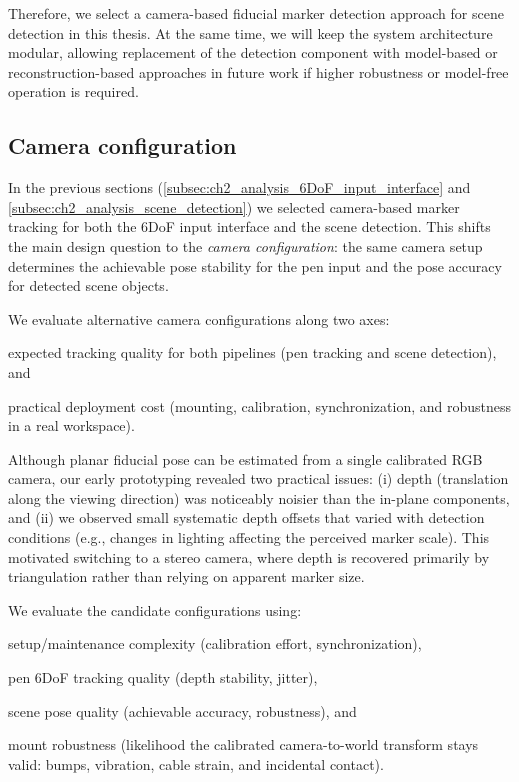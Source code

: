 Therefore, we select a camera-based fiducial marker detection approach for scene detection in this thesis. At the same time, we will keep the system architecture modular, allowing replacement of the detection component with model-based or reconstruction-based approaches in future work if higher robustness or model-free operation is required.


\subsection{Camera configuration} \label{subsec:ch2_analysis_camera_tradeoffs}

In the previous sections (\autoref{subsec:ch2_analysis_6DoF_input_interface} and \autoref{subsec:ch2_analysis_scene_detection}) we selected camera-based marker tracking for both the 6DoF input interface and the scene detection. This shifts the main design question to the \emph{camera configuration}: the same camera setup determines the achievable pose stability for the pen input and the pose accuracy for detected scene objects.

We evaluate alternative camera configurations along two axes:
\begin{enumerate*}[label=(\roman*)]
  \item expected tracking quality for both pipelines (pen tracking and scene detection), and
  \item practical deployment cost (mounting, calibration, synchronization, and robustness in a real workspace).
\end{enumerate*}

Although planar fiducial pose can be estimated from a single calibrated RGB camera, our early prototyping revealed two practical issues: (i) depth (translation along the viewing direction) was noticeably noisier than the in-plane components, and (ii) we observed small systematic depth offsets that varied with detection conditions (e.g., changes in lighting affecting the perceived marker scale). This motivated switching to a stereo camera, where depth is recovered primarily by triangulation rather than relying on apparent marker size.

We evaluate the candidate configurations using:
\begin{enumerate*}[label=(\roman*)]
    \item setup/maintenance complexity (calibration effort, synchronization),
    \item pen 6DoF tracking quality (depth stability, jitter),
    \item scene pose quality (achievable accuracy, robustness), and
    \item mount robustness (likelihood the calibrated camera-to-world transform stays valid: bumps, vibration, cable strain, and incidental contact).
\end{enumerate*}

